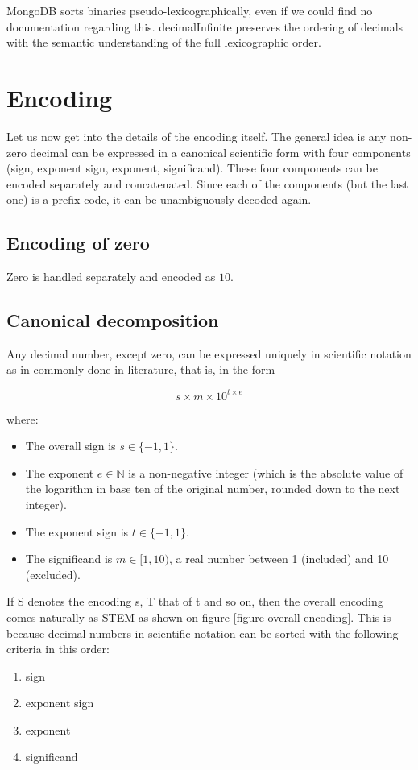 \documentclass{acm_proc_article-sp}
\begin{document}
MongoDB sorts binaries pseudo-lexicographically, even if we could find no documentation regarding this. decimalInfinite preserves the ordering of decimals with the semantic understanding of the full lexicographic order.

\section{Encoding}
\label{section-encoding}
Let us now get into the details of the encoding itself. The general idea is any non-zero decimal can be expressed in a canonical scientific form with four components (sign, exponent sign, exponent, significand). These four components can be encoded separately and concatenated. Since each of the components (but the last one) is a prefix code, it can be unambiguously decoded again.

\subsection{Encoding of zero}

Zero is handled separately and encoded as $10$.

\subsection{Canonical decomposition}

Any decimal number, except zero, can be expressed uniquely in scientific notation as in commonly done in literature, that is, in the form

$$s\times m \times10^{t\times e}$$

where:

\begin{itemize}
\item The overall sign is $s\in \{-1, 1\}$.
\item The exponent $e\in \mathbb{N}$ is a non-negative integer (which is the absolute value of the logarithm in base ten of the original number, rounded down to the next integer).
\item The exponent sign is $t\in \{-1, 1\}$.
\item The significand is $m\in [1,10)$, a real number between 1 (included) and 10 (excluded).
\end{itemize}

If S denotes the encoding s, T that of t and so on, then the overall encoding comes naturally as STEM as shown on figure \ref{figure-overall-encoding}. This is because decimal numbers in scientific notation can be sorted with the following criteria in this order:
\begin{enumerate}
\item sign
\item exponent sign
\item exponent
\item significand
\end{enumerate}
\end{document}
